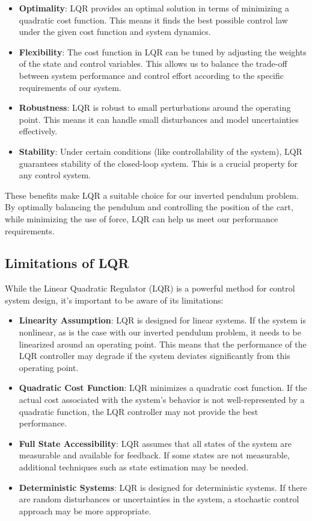 \documentclass[11pt,twocolumn,twoside,lineno]{pnas-new}
\begin{document}
\begin{itemize}
    \item \textbf{Optimality}: LQR provides an optimal solution in terms of minimizing a quadratic cost function. This means it finds the best possible control law under the given cost function and system dynamics.
    \item \textbf{Flexibility}: The cost function in LQR can be tuned by adjusting the weights of the state and control variables. This allows us to balance the trade-off between system performance and control effort according to the specific requirements of our system.
    \item \textbf{Robustness}: LQR is robust to small perturbations around the operating point. This means it can handle small disturbances and model uncertainties effectively.
    \item \textbf{Stability}: Under certain conditions (like controllability of the system), LQR guarantees stability of the closed-loop system. This is a crucial property for any control system.
\end{itemize}

These benefits make LQR a suitable choice for our inverted pendulum problem. By optimally balancing the pendulum and controlling the position of the cart, while minimizing the use of force, LQR can help us meet our performance requirements.

\subsection{Limitations of LQR}
While the Linear Quadratic Regulator (LQR) is a powerful method for control system design, it's important to be aware of its limitations:

\begin{itemize}
    \item \textbf{Linearity Assumption}: LQR is designed for linear systems. If the system is nonlinear, as is the case with our inverted pendulum problem, it needs to be linearized around an operating point. This means that the performance of the LQR controller may degrade if the system deviates significantly from this operating point.
    \item \textbf{Quadratic Cost Function}: LQR minimizes a quadratic cost function. If the actual cost associated with the system's behavior is not well-represented by a quadratic function, the LQR controller may not provide the best performance.
    \item \textbf{Full State Accessibility}: LQR assumes that all states of the system are measurable and available for feedback. If some states are not measurable, additional techniques such as state estimation may be needed.
    \item \textbf{Deterministic Systems}: LQR is designed for deterministic systems. If there are random disturbances or uncertainties in the system, a stochastic control approach may be more appropriate.
\end{itemize}
\end{document}
